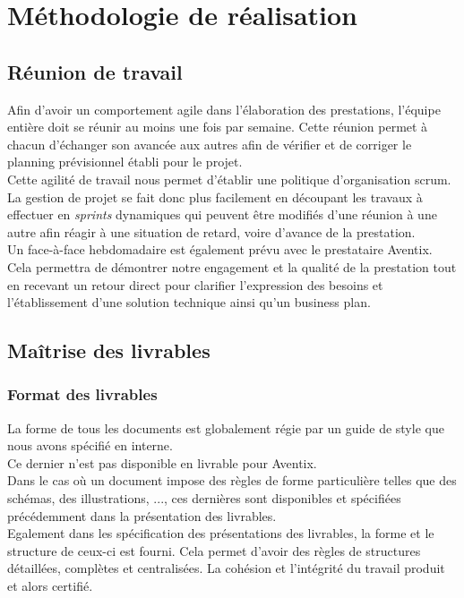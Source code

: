 \section{Méthodologie de réalisation}
\subsection{Réunion de travail}
Afin d'avoir un comportement agile dans l'élaboration des prestations, l'équipe
entière doit se réunir au moins une fois par semaine. Cette réunion permet à
chacun d'échanger son avancée aux autres afin de vérifier et de corriger le
planning prévisionnel établi pour le projet. \\

Cette agilité de travail nous permet d'établir une politique d'organisation
scrum. La gestion de projet se fait donc plus facilement en découpant les
travaux à effectuer en \textit{sprints} dynamiques qui peuvent être modifiés
d'une réunion à une autre afin réagir à une situation de retard, voire d'avance
de la prestation. \\

Un face-à-face hebdomadaire est également prévu avec le prestataire Aventix.
Cela permettra de démontrer notre engagement et la qualité de la prestation
tout en recevant un retour direct pour clarifier l'expression des besoins et
l'établissement d'une solution technique ainsi qu'un business plan. \\

\subsection{Maîtrise des livrables}
\subsubsection{Format des livrables}
La forme de tous les documents est globalement régie par un guide de style que
nous avons spécifié en interne. \\
Ce dernier n'est pas disponible en livrable pour Aventix. \\

Dans le cas où un document impose des règles de forme particulière telles que
des schémas, des illustrations, ..., ces dernières sont disponibles et
spécifiées précédemment dans la présentation des livrables. \\

Egalement dans les spécification des présentations des livrables, la forme et
le structure de ceux-ci est fourni. Cela permet d'avoir des règles de
structures détaillées, complètes et centralisées. La cohésion et l'intégrité du
travail produit et alors certifié. \\


